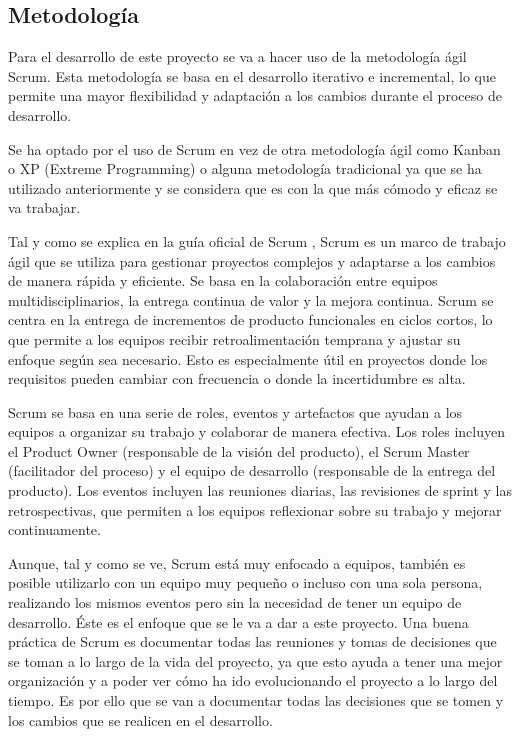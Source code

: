 \subsection{Metodología}
\label{sec:metodologia}

Para el desarrollo de este proyecto se va a hacer uso de la metodología ágil Scrum. Esta metodología se basa en el desarrollo iterativo e incremental, lo que permite una mayor flexibilidad y adaptación a los cambios durante el proceso de desarrollo.

Se ha optado por el uso de Scrum en vez de otra metodología ágil como Kanban o XP (Extreme Programming) o alguna metodología tradicional ya que se ha utilizado anteriormente y se considera que es con la que más cómodo y eficaz se va trabajar.

Tal y como se explica en la guía oficial de Scrum \parencite{scrum-guide}, Scrum es un marco de trabajo ágil que se utiliza para gestionar proyectos complejos y adaptarse a los cambios de manera rápida y eficiente. Se basa en la colaboración entre equipos multidisciplinarios, la entrega continua de valor y la mejora continua.
Scrum se centra en la entrega de incrementos de producto funcionales en ciclos cortos, lo que permite a los equipos recibir retroalimentación temprana y ajustar su enfoque según sea necesario. Esto es especialmente útil en proyectos donde los requisitos pueden cambiar con frecuencia o donde la incertidumbre es alta.

Scrum se basa en una serie de roles, eventos y artefactos que ayudan a los equipos a organizar su trabajo y colaborar de manera efectiva. Los roles incluyen el Product Owner (responsable de la visión del producto), el Scrum Master (facilitador del proceso) y el equipo de desarrollo (responsable de la entrega del producto). Los eventos incluyen las reuniones diarias, las revisiones de sprint y las retrospectivas, que permiten a los equipos reflexionar sobre su trabajo y mejorar continuamente.

Aunque, tal y como se ve, Scrum está muy enfocado a equipos, también es posible utilizarlo con un equipo muy pequeño o incluso con una sola persona, realizando los mismos eventos pero sin la necesidad de tener un equipo de desarrollo. Éste es el enfoque que se le va a dar a este proyecto. Una buena práctica de Scrum es documentar todas las reuniones y tomas de decisiones que se toman a lo largo de la vida del proyecto, ya que esto ayuda a tener una mejor organización y a poder ver cómo ha ido evolucionando el proyecto a lo largo del tiempo. Es por ello que se van a documentar todas las decisiones que se tomen y los cambios que se realicen en el desarrollo.

